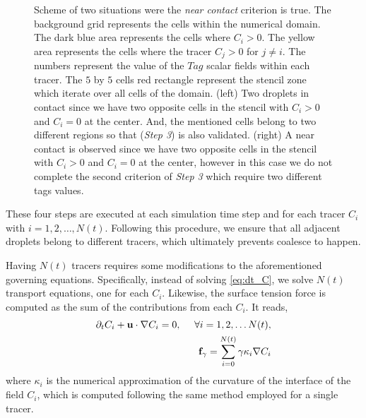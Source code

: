 \begin{figure}
    \caption{Scheme of two situations were the \textit{near contact} criterion is true. 
    The background grid represents the cells within the numerical domain. 
    The dark blue area represents the cells where $C_i > 0$.
    The yellow area represents the cells where the tracer $C_j > 0$ for $j\neq i$. 
    The numbers represent the value of the $Tag$ scalar fields within each tracer.
    The $5$ by $5$ cells red rectangle represent the stencil zone which iterate over all cells of the domain.  
    (left) Two droplets in contact since we have two opposite cells in the stencil with $C_i > 0$ and $C_i=0$ at the center.
    And, the mentioned cells belong to two different regions so that (\textit{Step 3}) is also validated.  
    (right) A near contact is observed since we have two opposite cells in the stencil with $C_i > 0$ and $C_i=0$ at the center, however in this case we do not complete the second criterion of \textit{Step 3} which require two different tags values. 
    }
    \label{fig:criterion}
\end{figure}
These four steps are executed at each simulation time step and for each tracer $C_i$ with $i = 1, 2, \ldots, N(t)$.
Following this procedure, we ensure that all adjacent droplets belong to different tracers, which ultimately prevents coalesce to happen. 

Having $N(t)$ tracers requires some modifications to the aforementioned governing equations. 
Specifically, instead of solving \ref{eq:dt_C}, we solve $N(t)$ transport equations, one for each $C_i$.
Likewise, the surface tension force is computed as the sum of the contributions from each $C_i$.
It reads,  
\begin{align*}
    \partial_t C_i + \textbf{u}\cdot\mathbf{\nabla} C_i = 0,
    \ \  \ \ \forall i = 1,2,\ldots N(t),\\
    \textbf{f}_\gamma 
    = \sum_{i=0}^{N(t)} \gamma \kappa_i \mathbf{\nabla} C_i
\end{align*}
where $\kappa_i$ is the numerical approximation of the curvature of the interface of the field $C_i$, which is computed following the same method employed for a single tracer. 

